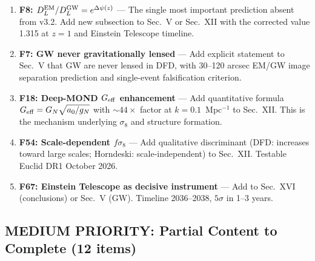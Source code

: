 \documentclass[11pt,a4paper]{article}
\begin{document}
\begin{enumerate}
\item \textbf{F8: $D_L^{\rm EM}/D_L^{\rm GW} = e^{\Delta\psi(z)}$} --- The single most important prediction absent from v3.2. Add new subsection to Sec.~V or Sec.~XII with the corrected value 1.315 at $z=1$ and Einstein Telescope timeline.

\item \textbf{F7: GW never gravitationally lensed} --- Add explicit statement to Sec.~V that GW are never lensed in DFD, with 30--120 arcsec EM/GW image separation prediction and single-event falsification criterion.

\item \textbf{F18: Deep-MOND $G_{\rm eff}$ enhancement} --- Add quantitative formula $G_{\rm eff} = G_N\sqrt{a_0/g_N}$ with $\sim 44\times$ factor at $k = 0.1$~Mpc$^{-1}$ to Sec.~XII. This is the mechanism underlying $\sigma_8$ and structure formation.

\item \textbf{F54: Scale-dependent $f\sigma_8$} --- Add qualitative discriminant (DFD: increases toward large scales; Horndeski: scale-independent) to Sec.~XII. Testable Euclid DR1 October 2026.

\item \textbf{F67: Einstein Telescope as decisive instrument} --- Add to Sec.~XVI (conclusions) or Sec.~V (GW). Timeline 2036--2038, $5\sigma$ in 1--3 years.
\end{enumerate}

\subsection{MEDIUM PRIORITY: Partial Content to Complete (12 items)}
\end{document}
